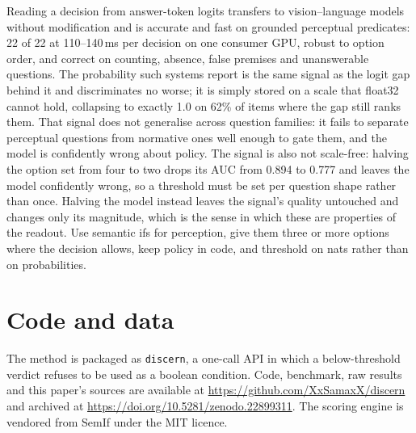 \documentclass[10pt,twocolumn]{article}
\begin{document}
Reading a decision from answer-token logits transfers to vision--language
models without modification and is accurate and fast on grounded perceptual
predicates: 22 of 22 at 110--140\,ms per decision on one consumer GPU, robust
to option order, and correct on counting, absence, false premises and
unanswerable questions. The probability such systems report is the same signal as the logit gap behind
it and discriminates no worse; it is simply stored on a scale that float32
cannot hold, collapsing to exactly 1.0 on 62\% of items where the gap still
ranks them. That signal does not
generalise across question families: it fails to separate perceptual questions
from normative ones well enough to gate them, and the model is confidently
wrong about policy. The signal is also not scale-free: halving the option set from four to two
drops its AUC from 0.894 to 0.777 and leaves the model confidently wrong, so a
threshold must be set per question shape rather than once. Halving the model
instead leaves the signal's quality untouched and changes only its magnitude,
which is the sense in which these are properties of the readout. Use semantic ifs for
perception, give them three or more options where the decision allows, keep
policy in code, and threshold on nats rather than on probabilities.

\section*{Code and data}

The method is packaged as \texttt{discern}, a one-call API in which a
below-threshold verdict refuses to be used as a boolean condition. Code,
benchmark, raw results and this paper's sources are available at
\url{https://github.com/XxSamaxX/discern} and archived at
\url{https://doi.org/10.5281/zenodo.22899311}. The scoring engine is vendored
from SemIf \cite{semif} under the MIT licence.



\end{document}
